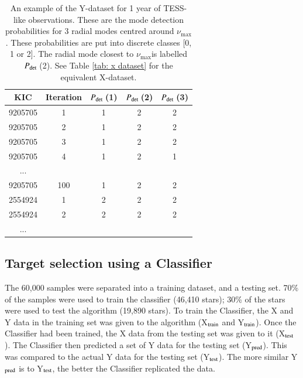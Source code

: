 \documentclass[a4paper,fleqn,usenatbib,useAMS]{mnras}
\newcommand{\numax}{\ensuremath{\nu_{\textrm{max}}}}
\newcommand{\pdet}{\ensuremath{P_{\rm det}\:}}
\begin{document}
\begin{table}
\begin{center}
\begin{tabular}{|*{5}{c|}}
KIC & Iteration & \pdet(1) & \pdet(2) & \pdet(3) \\
\hline
9205705	& 1     & 1 & 2 & 2 \\
9205705	& 2     & 1 & 2 & 2 \\
9205705	& 3     & 1 & 2 & 2 \\
9205705	& 4     & 1 & 2 & 1 \\
...                         \\
9205705	& 100   & 1 & 2 & 2 \\
2554924	& 1	    & 2 & 2 & 2 \\
2554924	& 2     & 2 & 2 & 2 \\
...                         \\
\hline
\end{tabular}
\end{center}
\caption{An example of the Y-dataset for 1 year of TESS-like observations. These are the mode detection probabilities for 3 radial modes centred around \numax. These probabilities are put into discrete classes [0, 1 or 2]. The radial mode closest to \numax is labelled \pdet(2). See Table \ref{tab: x dataset} for the equivalent X-dataset.}
\label{tab: y dataset}
\end{table}



\subsection{Target selection using a Classifier}
\label{sect: class-results}

The 60,000 samples were separated into a training dataset, and a testing set. 70\% of the samples were used to train the classifier (46,410 stars); 30\% of the stars were used to test the algorithm (19,890 stars). To train the Classifier, the X and Y data in the training set was given to the algorithm (X$_{\rm train}$ and Y$_{\rm train}$). Once the Classifier had been trained, the X data from the testing set was given to it (X$_{\rm test}$). The Classifier then predicted a set of Y data for the testing set (Y$_{\rm pred}$). This was compared to the actual Y data for the testing set (Y$_{\rm test}$). The more similar Y$_{\rm pred}$ is to Y$_{\rm test}$, the better the Classifier replicated the data.
\end{document}
